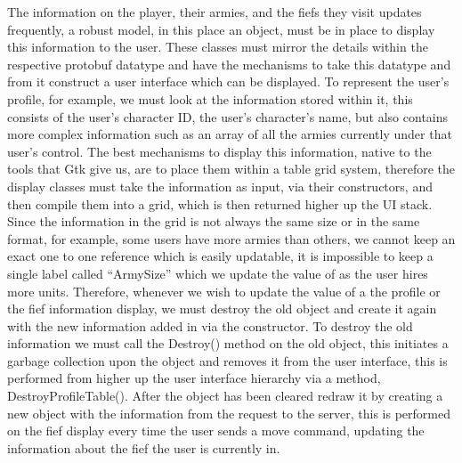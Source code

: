 \documentclass{article}
\begin{document}
The information on the player, their armies, and the fiefs they visit updates frequently, a robust model, in this place an object, must be in place to display this information to the user. These classes must mirror the details within the respective protobuf datatype and have the mechanisms to take this datatype and from it construct a user interface which can be displayed. To represent the user’s profile, for example, we must look at the information stored within it, this consists of the user’s character ID, the user’s character’s name, but also contains more complex information such as an array of all the armies currently under that user’s control. The best mechanisms to display this information, native to the tools that Gtk give us, are to place them within a table grid system, therefore the display classes must take the information as input, via their constructors, and then compile them into a grid, which is then returned higher up the UI stack. Since the information in the grid is not always the same size or in the same format, for example, some users have more armies than others, we cannot keep an exact one to one reference which is easily updatable, it is impossible to keep a single label called “ArmySize” which we update the value of as the user hires more units. Therefore, whenever we wish to update the value of a the profile or the fief information display, we must destroy the old object and create it again with the new information added in via the constructor. To destroy the old information we must call the Destroy() method on the old object, this initiates a garbage collection upon the object and removes it from the user interface, this is performed from higher up the user interface hierarchy via a method, DestroyProfileTable(). After the object has been cleared redraw it by creating a new object with the information from the request to the server, this is performed on the fief display every time the user sends a move command, updating the information about the fief the user is currently in.
\end{document}
